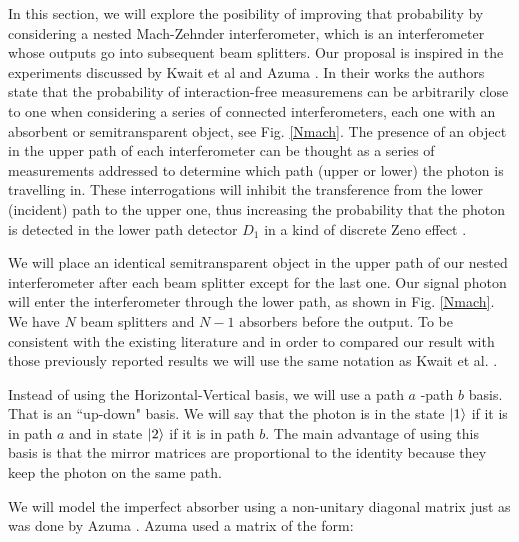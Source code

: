 \documentclass[12pt]{book}
\begin{document}
In this section, we will explore the posibility of improving that probability by considering a nested Mach-Zehnder interferometer, which is an interferometer whose outputs go into subsequent beam splitters. Our proposal is inspired in the experiments discussed by Kwait et al \cite{5} and Azuma \cite{Azuma}. In their works the authors state that the probability of interaction-free measuremens can be arbitrarily close to one when considering a series of connected interferometers, each one with an absorbent or semitransparent object, see Fig. \ref{Nmach}. The presence of an object in the upper path of each interferometer can be thought as a series of measurements addressed to determine which path (upper or lower) the photon is travelling in. These interrogations will inhibit the transference from the lower (incident) path to the upper one, thus increasing the probability that the photon is detected in the lower path detector $D_{1}$ in a kind of discrete Zeno effect \cite{5}.

  We will place an identical semitransparent object in the upper path of our nested interferometer after each beam splitter except for the last one. Our signal photon will enter the interferometer through the lower path, as shown in Fig. \ref{Nmach}. We have $N$ beam splitters and $N-1$ absorbers before the output. To be consistent with the existing literature and in order to compared our result with those previously reported results we will use the same notation as Kwait et al. \cite{5}.
 
 
Instead of using the Horizontal-Vertical basis, we will use a path $a$ -path $b$ basis. That is an ``up-down" basis. We will say that the photon is in the state $\ket{1}$ if it is in path $a$ and in state $\ket{2}$ if it is in path $b$. The main advantage of using this basis is that the mirror matrices are proportional to the identity because they keep the photon on the same path.
 

 
 
  We will model the imperfect absorber using a non-unitary diagonal matrix just as was done by  Azuma \cite{Azuma}. Azuma used a matrix of the form:
 
\end{document}
